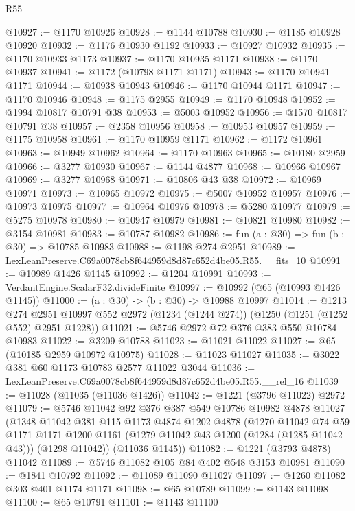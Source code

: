 \begin{lexlean}{R55}
\begin{coremodule}
@10927 := @1170 @10926
@10928 := @1144 @10788
@10930 := @1185 @10928 @10920
@10932 := @1176 @10930 @1192
@10933 := @10927 @10932
@10935 := @1170 @10933 @1173
@10937 := @1170 @10935 @1171
@10938 := @1170 @10937
@10941 := @1172 (@10798 @1171 @1171)
@10943 := @1170 @10941 @1171
@10944 := @10938 @10943
@10946 := @1170 @10944 @1171
@10947 := @1170 @10946
@10948 := @1175 @2955
@10949 := @1170 @10948
@10952 := @1994 @10817 @10791 @38
@10953 := @5003 @10952
@10956 := @1570 @10817 @10791 @38
@10957 := @2358 @10956
@10958 := @10953 @10957
@10959 := @1175 @10958
@10961 := @1170 @10959 @1171
@10962 := @1172 @10961
@10963 := @10949 @10962
@10964 := @1170 @10963
@10965 := @10180 @2959
@10966 := @3277 @10930
@10967 := @1144 @4877
@10968 := @10966 @10967
@10969 := @3277 @10968
@10971 := @10806 @43 @38
@10972 := @10969 @10971
@10973 := @10965 @10972
@10975 := @5007 @10952 @10957
@10976 := @10973 @10975
@10977 := @10964 @10976
@10978 := @5280 @10977
@10979 := @5275 @10978
@10980 := @10947 @10979
@10981 := @10821 @10980
@10982 := @3154 @10981
@10983 := @10787 @10982
@10986 := fun (a : @30) => fun (b : @30) => @10785 @10983
@10988 := @1198 @274 @2951
@10989 := LexLeanPreserve.C69a0078cb8f644959d8d87c652d4be05.R55.__fits_10
@10991 := @10989 @1426 @1145
@10992 := @1204 @10991
@10993 := VerdantEngine.ScalarF32.divideFinite
@10997 := @10992 (@65 (@10993 @1426 @1145))
@11000 := (a : @30) -> (b : @30) -> @10988 @10997
@11014 := @1213
    @274
    @2951
    @10997
    @552
    @2972
    (@1234 (@1244 @274))
    (@1250 (@1251 (@1252 @552) @2951 @1228))
@11021 := @5746 @2972 @72 @376 @383 @550 @10784 @10983
@11022 := @3209 @10788
@11023 := @11021 @11022
@11027 := @65 (@10185 @2959 @10972 @10975)
@11028 := @11023 @11027
@11035 := @3022 @381 @60 @1173 @10783 @2577 @11022 @3044
@11036 := LexLeanPreserve.C69a0078cb8f644959d8d87c652d4be05.R55.__rel_16
@11039 := @11028 (@11035 (@11036 @1426))
@11042 := @1221 (@3796 @11022) @2972
@11079 := @5746
    @11042
    @92
    @376
    @387
    @549
    @10786
    @10982
    @4878
    @11027
    (@1348
      @11042
      @381
      @115
      @1173
      @4874
      @1202
      @4878
      (@1270
        @11042
        @74
        @59
        @1171
        @1171
        @1200
        @1161
        (@1279 @11042 @43 @1200 (@1284 (@1285 @11042 @43)))
        (@1298 @11042))
      (@11036 @1145))
@11082 := @1221 (@3793 @4878) @11042
@11089 := @5746 @11082 @105 @84 @402 @548 @3153 @10981
@11090 := @1841 @10792
@11092 := @11089 @11090 @11027
@11097 := @1260 @11082 @303 @401 @1174 @1171
@11098 := @65 @10789
@11099 := @1143 @11098
@11100 := @65 @10791
@11101 := @1143 @11100

\end{coremodule}
\end{lexlean}
